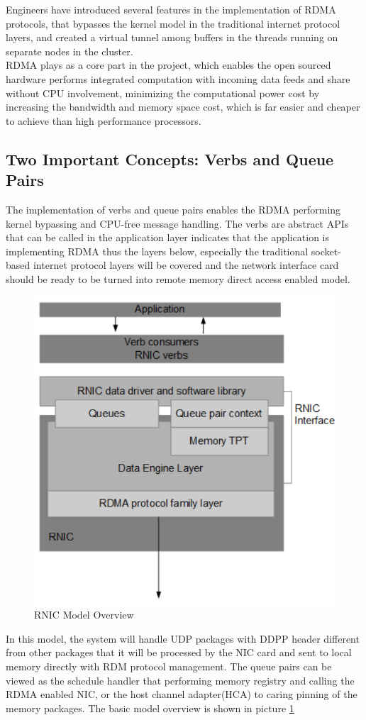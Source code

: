 \documentclass[11pt,openright,a4paper]{report}
\begin{document}
Engineers have introduced several features in the implementation of RDMA protocols, that bypasses the kernel model in the traditional internet protocol layers, and created a virtual tunnel among buffers in the threads running on separate nodes in the cluster.\\
RDMA plays as a core part in the project, which enables the open sourced hardware performs integrated computation with incoming data feeds and share without CPU involvement,  minimizing the computational power cost by increasing the bandwidth and memory space cost, which is far easier and cheaper to achieve than high performance processors.\\
\subsection{Two Important Concepts: Verbs and Queue Pairs}
The implementation of verbs and queue pairs enables the RDMA performing kernel bypassing and CPU-free message handling\cite{recio2003rdma}. The verbs are abstract APIs that can be called in the application layer indicates that the application is implementing RDMA thus the layers below, especially the traditional socket-based internet protocol layers will be covered and the network interface card should be ready to be turned into remote memory direct access enabled model.\\
\begin{figure}[H]
	\centering
	\includegraphics[width=0.6\linewidth]{picture/rnic.PNG}
	\caption{RNIC Model Overview}
	\label{fig:rnic}
\end{figure}
In this model, the system will handle UDP packages with DDPP header different from other packages that it will be processed by the NIC card and sent to local memory directly with RDM protocol management. The queue pairs can be viewed as the schedule handler that performing memory registry and calling the RDMA enabled NIC, or the host channel adapter(HCA) to caring pinning of the memory packages\cite{subramoni2009rdma}. The basic model overview is shown in picture \ref{fig:rnic}\\
\end{document}

